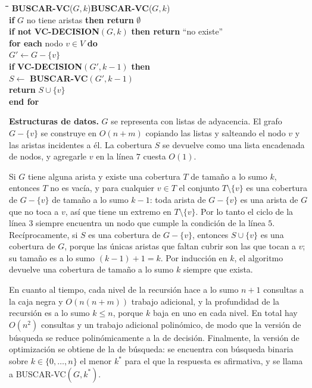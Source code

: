 \documentclass[12pt, spanish, oneside, openany]{book}
\newcommand{\pl}[1]{\makebox[1.6em][r]{\texttt{\footnotesize #1}}\hspace{0.9em}}
\newenvironment{pseudo}[1]{%
  \begin{center}%
  \begin{mdframed}[style=pseudobox]%
  \small
  \begin{tabbing}%
  \hspace{2.5em}\=\hspace{1.5em}\=\hspace{1.5em}\=\hspace{1.5em}\=\hspace{1.5em}\=\kill
  \def\pseudotitulo{#1}\ifx\pseudotitulo\empty\else#1\\[3pt]\fi}%
  {\end{tabbing}\end{mdframed}\end{center}}
\newenvironment{estructuras}%
  {\begin{center}\begin{minipage}{0.93\textwidth}\begin{mdframed}[style=estrbox]%
   \small\textbf{Estructuras de datos.}\;}%
  {\end{mdframed}\end{minipage}\end{center}}
\newcommand{\alg}[1]{#1}
\theoremstyle{uprightplain}
\theoremstyle{definition}
\theoremstyle{remark}
\theoremstyle{definition}
\begin{document}
\begin{pseudo}{\textbf{BUSCAR-VC}($G,k$)}
\pl{1}\> \textbf{if} $G$ no tiene aristas \textbf{then return} $\emptyset$\\
\pl{2}\> \textbf{if not} \textbf{VC-DECISION}$(G,k)$ \textbf{then return} ``no existe''\\
\pl{3}\> \textbf{for each} nodo $v\in V$ \textbf{do}\\
\pl{4}\>\> $G'\leftarrow G-\{v\}$\\
\pl{5}\>\> \textbf{if} \textbf{VC-DECISION}$(G',k-1)$ \textbf{then}\\
\pl{6}\>\>\> $S\leftarrow$ \textbf{BUSCAR-VC}$(G',k-1)$\\
\pl{7}\>\>\> \textbf{return} $S\cup\{v\}$\\
\pl{8}\> \textbf{end for}
\end{pseudo}

\begin{estructuras}
$G$ se representa con listas de adyacencia. El grafo $G-\{v\}$ se construye en
$O(n+m)$ copiando las listas y salteando el nodo $v$ y las aristas incidentes a
él. La cobertura $S$ se devuelve como una lista encadenada de nodos, y agregarle
$v$ en la línea $7$ cuesta $O(1)$.
\end{estructuras}

Si $G$ tiene alguna arista y existe una cobertura $T$ de tamaño a lo sumo $k$, entonces $T$ no es vacía, y para cualquier $v\in T$ el conjunto $T\setminus\{v\}$ es una cobertura de $G-\{v\}$ de tamaño a lo sumo $k-1$: toda arista de $G-\{v\}$ es una arista de $G$ que no toca a $v$, así que tiene un extremo en $T\setminus\{v\}$. Por lo tanto el ciclo de la línea $3$ siempre encuentra un nodo que cumple la condición de la línea $5$. Recíprocamente, si $S$ es una cobertura de $G-\{v\}$, entonces $S\cup\{v\}$ es una cobertura de $G$, porque las únicas aristas que faltan cubrir son las que tocan a $v$; su tamaño es a lo sumo $(k-1)+1=k$. Por inducción en $k$, el algoritmo devuelve una cobertura de tamaño a lo sumo $k$ siempre que exista.

En cuanto al tiempo, cada nivel de la recursión hace a lo sumo $n+1$ consultas a la caja negra y $O(n(n+m))$ trabajo adicional, y la profundidad de la recursión es a lo sumo $k\le n$, porque $k$ baja en uno en cada nivel. En total hay $O(n^2)$ consultas y un trabajo adicional polinómico, de modo que la versión de búsqueda se reduce polinómicamente a la de decisión. Finalmente, la versión de optimización se obtiene de la de búsqueda: se encuentra con búsqueda binaria sobre $k\in\{0,\dots,n\}$ el menor $k^{*}$ para el que la respuesta es afirmativa, y se llama a \alg{BUSCAR-VC}$(G,k^{*})$.
\end{document}
